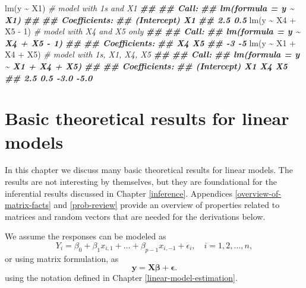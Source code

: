 \documentclass[
]{book}
\newenvironment{Shaded}{\begin{snugshade}}{\end{snugshade}}
\newcommand{\CommentTok}[1]{\textcolor[rgb]{0.56,0.35,0.01}{\textit{#1}}}
\newcommand{\DecValTok}[1]{\textcolor[rgb]{0.00,0.00,0.81}{#1}}
\newcommand{\DocumentationTok}[1]{\textcolor[rgb]{0.56,0.35,0.01}{\textbf{\textit{#1}}}}
\newcommand{\FunctionTok}[1]{\textcolor[rgb]{0.00,0.00,0.00}{#1}}
\newcommand{\NormalTok}[1]{#1}
\newcommand{\SpecialCharTok}[1]{\textcolor[rgb]{0.00,0.00,0.00}{#1}}
\theoremstyle{definition}
\theoremstyle{definition}
\theoremstyle{definition}
\theoremstyle{definition}
\theoremstyle{remark}
\begin{document}
\begin{Shaded}
\begin{Highlighting}[]
\FunctionTok{lm}\NormalTok{(y }\SpecialCharTok{\textasciitilde{}}\NormalTok{ X1)           }\CommentTok{\# model with 1s and X1}
\DocumentationTok{\#\# }
\DocumentationTok{\#\# Call:}
\DocumentationTok{\#\# lm(formula = y \textasciitilde{} X1)}
\DocumentationTok{\#\# }
\DocumentationTok{\#\# Coefficients:}
\DocumentationTok{\#\# (Intercept)           X1  }
\DocumentationTok{\#\#         2.5          0.5}
\FunctionTok{lm}\NormalTok{(y }\SpecialCharTok{\textasciitilde{}}\NormalTok{ X4 }\SpecialCharTok{+}\NormalTok{ X5 }\SpecialCharTok{{-}} \DecValTok{1}\NormalTok{)  }\CommentTok{\# model with X4 and X5 only}
\DocumentationTok{\#\# }
\DocumentationTok{\#\# Call:}
\DocumentationTok{\#\# lm(formula = y \textasciitilde{} X4 + X5 {-} 1)}
\DocumentationTok{\#\# }
\DocumentationTok{\#\# Coefficients:}
\DocumentationTok{\#\# X4  X5  }
\DocumentationTok{\#\# {-}3  {-}5}
\FunctionTok{lm}\NormalTok{(y }\SpecialCharTok{\textasciitilde{}}\NormalTok{ X1 }\SpecialCharTok{+}\NormalTok{ X4 }\SpecialCharTok{+}\NormalTok{ X5) }\CommentTok{\# model with 1s, X1, X4, X5}
\DocumentationTok{\#\# }
\DocumentationTok{\#\# Call:}
\DocumentationTok{\#\# lm(formula = y \textasciitilde{} X1 + X4 + X5)}
\DocumentationTok{\#\# }
\DocumentationTok{\#\# Coefficients:}
\DocumentationTok{\#\# (Intercept)           X1           X4           X5  }
\DocumentationTok{\#\#         2.5          0.5         {-}3.0         {-}5.0}
\end{Highlighting}
\end{Shaded}

\hypertarget{linear-model-theory}{%
\chapter{Basic theoretical results for linear models}\label{linear-model-theory}}

In this chapter we discuss many basic theoretical results for linear models. The results are not interesting by themselves, but they are foundational for the inferential results discussed in Chapter \ref{inference}. Appendices \ref{overview-of-matrix-facts} and \ref{prob-review} provide an overview of properties related to matrices and random vectors that are needed for the derivations below.

We assume the responses can be modeled as
\[
Y_i=\beta_0+\beta_1 x_{i,1} +\ldots + \beta_{p-1}x_{i,-1}+\epsilon_i,\quad i=1,2,\ldots,n,
\]
or using matrix formulation, as
\[
\mathbf{y} = \mathbf{X}\boldsymbol{\beta}+\boldsymbol{\epsilon}.\label{eq:linear-model-def-matrix}
\]
using the notation defined in Chapter \ref{linear-model-estimation}.
\end{document}
